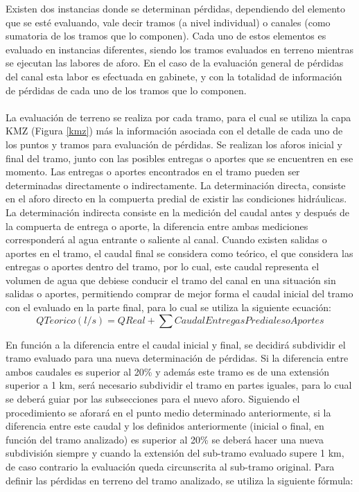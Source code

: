 \documentclass[]{article}
\begin{document}
Existen dos instancias donde se determinan pérdidas, dependiendo del elemento que se esté evaluando, vale decir tramos (a nivel individual) o canales (como sumatoria de los tramos que lo componen). Cada uno de estos elementos es evaluado en instancias diferentes, siendo los tramos evaluados en terreno mientras se ejecutan las labores de aforo. En el caso de la evaluación general de pérdidas del canal esta labor es efectuada en gabinete, y con la totalidad de información de pérdidas de cada uno de los tramos que lo componen.\\
\\
La evaluación de terreno se realiza por cada tramo, para el cual se utiliza la capa KMZ (Figura \ref{kmz}) más la información asociada con el detalle de cada uno de los puntos y tramos para evaluación de pérdidas. Se realizan los aforos inicial y final del tramo, junto con las posibles entregas o aportes que se encuentren en ese momento. Las entregas o aportes encontrados en el tramo pueden ser determinadas directamente o indirectamente. La determinación directa, consiste en el aforo directo en la compuerta predial de existir las condiciones hidráulicas. La determinación indirecta consiste en la medición del caudal antes y después de la compuerta de entrega o aporte, la diferencia entre ambas mediciones corresponderá al agua entrante o saliente al canal. Cuando existen salidas o aportes en el tramo, el caudal final se considera como teórico, el que considera las entregas o aportes dentro del tramo, por lo cual, este caudal representa el volumen de agua que debiese conducir el tramo del canal en una situación sin salidas o aportes, permitiendo comprar de mejor forma el caudal inicial del tramo con el evaluado en la parte final, para lo cual se utiliza la siguiente ecuación:\\

\begin{equation}
Q Teorico (l/s) = Q Real + \sum{Caudal Entregas Prediales o Aportes}
\end{equation}

En función a la diferencia entre el caudal inicial y final, se decidirá subdividir el tramo evaluado para una nueva determinación de pérdidas.  Si la diferencia entre ambos caudales es superior al 20\% y además este tramo es de una extensión superior a 1 km, será necesario subdividir el tramo en partes iguales, para lo cual se deberá guiar por las subsecciones para el nuevo aforo. Siguiendo el procedimiento se aforará en el punto medio determinado anteriormente, si la diferencia entre este caudal y los definidos  anteriormente (inicial o final, en función del tramo analizado) es superior al 20\% se deberá hacer una nueva subdivisión siempre y cuando la extensión del sub-tramo evaluado supere 1 km, de caso contrario la evaluación queda circunscrita al sub-tramo original. Para definir las pérdidas en terreno del tramo analizado, se utiliza la siguiente fórmula:
\end{document}
